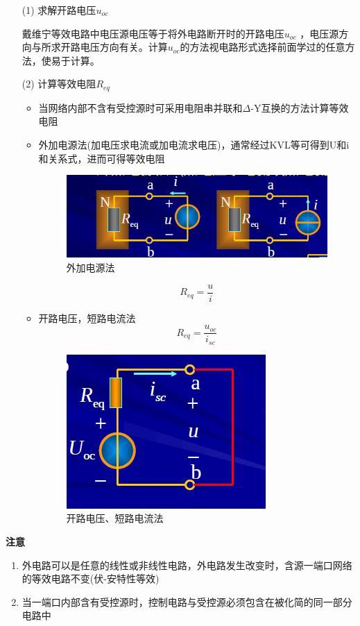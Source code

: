 \documentclass[11pt,a4paper,oneside]{book}
\begin{document}
\begin{enumerate}
	\item[(1)]求解开路电压$u_{oc}$
	
	戴维宁等效电路中电压源电压等于将外电路断开时的开路电压$u_{oc}$ ，电压源方向与所求开路电压方向有关。计算$u_{oc}$的方法视电路形式选择前面学过的任意方法，使易于计算。
	\item[(2)]计算等效电阻$R_{eq}$
	
	\begin{itemize}
		\item 当网络内部不含有受控源时可采用电阻串并联和$\Delta$-Y互换的方法计算等效电阻
		\item 外加电源法(加电压求电流或加电流求电压)，通常经过KVL等可得到U和i和关系式，进而可得等效电阻
		\begin{figure}[H]
			\centering
			\includegraphics[width=0.5\linewidth]{screenshot067}
			\caption{外加电源法}
			\label{fig:screenshot067}
		\end{figure}
		\begin{equation}
			R_{eq}=\frac{u}{i}
		\end{equation}
		\item 开路电压，短路电流法
		\begin{equation}
			R_{eq}=\frac{u_{oc}}{i_{sc}}
		\end{equation}
		\begin{figure}[H]
			\centering
			\includegraphics[width=0.4\linewidth]{screenshot068}
			\caption{开路电压、短路电流法}
			\label{fig:screenshot068}
		\end{figure}
		
	\end{itemize}
\end{enumerate}
\noindent\textbf{注意}
\begin{enumerate}
	\item 外电路可以是任意的线性或非线性电路，外电路发生改变时，含源一端口网络的等效电路不变(伏-安特性等效)
	\item 当一端口内部含有受控源时，控制电路与受控源必须包含在被化简的同一部分电路中
\end{enumerate}
\end{document}
